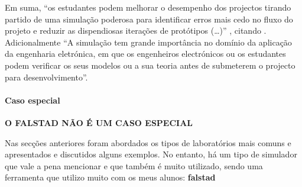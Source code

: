 Em suma, ``os estudantes podem melhorar o desempenho dos projectos tirando partido de uma simulação poderosa para identificar erros mais cedo no fluxo do projeto e reduzir as dispendiosas iterações de protótipos (\ldots)'' \cite{AvoidingCircuitErrorsMultisim}, citando \cite{ApplicationMultisimVirtualLaboratory}. Adicionalmente ``A simulação tem grande importância no domínio da aplicação da engenharia eletrónica, em que os engenheiros electrónicos ou os estudantes podem verificar os seus modelos ou a sua teoria antes de submeterem o projecto para desenvolvimento\cite{ImportantSimSoftware}''.

\paragraph{Caso especial}

\textbf{O FALSTAD NÃO É UM CASO ESPECIAL}

Nas secções anteriores foram abordados os tipos de laboratórios mais comuns e apresentados e discutidos alguns exemplos. No entanto, há um tipo de simulador que vale a pena mencionar e que também é muito utilizado, sendo uma ferramenta que utilizo muito com os meus alunos: \textbf{falstad}\cite{falstad}











